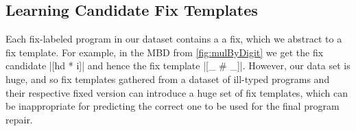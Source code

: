 



\subsection{Learning Candidate Fix Templates}
\label{sec:overview:learn}

Each fix-labeled program in our dataset contains a 
a fix, which we abstract to a fix template. 
For example, in the MBD from \autoref{fig:mulByDigit}
we get the fix candidate |[hd * i]| and hence the 
fix template |[_ # _]|. 
However, our data set is huge, and so 
fix templates gathered from a dataset of ill-typed 
programs and their respective fixed version can 
introduce a huge set of fix templates, which can be inappropriate 
for predicting the correct one to be used for the final 
program repair. 

